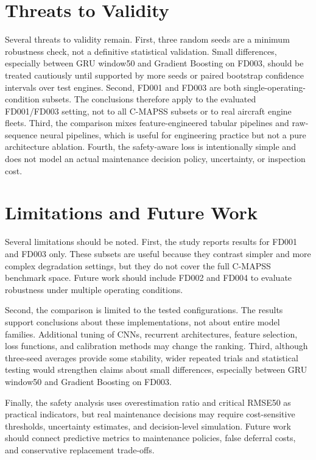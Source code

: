 \documentclass[11pt,a4paper]{article}
\begin{document}
\section{Threats to Validity}

Several threats to validity remain. First, three random seeds are a minimum robustness check, not a definitive statistical validation. Small differences, especially between GRU window50 and Gradient Boosting on FD003, should be treated cautiously until supported by more seeds or paired bootstrap confidence intervals over test engines. Second, FD001 and FD003 are both single-operating-condition subsets. The conclusions therefore apply to the evaluated FD001/FD003 setting, not to all C-MAPSS subsets or to real aircraft engine fleets. Third, the comparison mixes feature-engineered tabular pipelines and raw-sequence neural pipelines, which is useful for engineering practice but not a pure architecture ablation. Fourth, the safety-aware loss is intentionally simple and does not model an actual maintenance decision policy, uncertainty, or inspection cost.

\section{Limitations and Future Work}

Several limitations should be noted. First, the study reports results for FD001 and FD003 only. These subsets are useful because they contrast simpler and more complex degradation settings, but they do not cover the full C-MAPSS benchmark space. Future work should include FD002 and FD004 to evaluate robustness under multiple operating conditions.

Second, the comparison is limited to the tested configurations. The results support conclusions about these implementations, not about entire model families. Additional tuning of CNNs, recurrent architectures, feature selection, loss functions, and calibration methods may change the ranking. Third, although three-seed averages provide some stability, wider repeated trials and statistical testing would strengthen claims about small differences, especially between GRU window50 and Gradient Boosting on FD003.

Finally, the safety analysis uses overestimation ratio and critical RMSE50 as practical indicators, but real maintenance decisions may require cost-sensitive thresholds, uncertainty estimates, and decision-level simulation. Future work should connect predictive metrics to maintenance policies, false deferral costs, and conservative replacement trade-offs.
\end{document}
